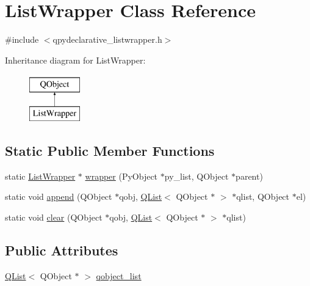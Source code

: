\hypertarget{classListWrapper}{}\section{List\+Wrapper Class Reference}
\label{classListWrapper}


{\ttfamily \#include $<$qpydeclarative\+\_\+listwrapper.\+h$>$}

Inheritance diagram for List\+Wrapper\+:\begin{figure}[H]
\begin{center}
\leavevmode
\includegraphics[height=2.000000cm]{classListWrapper}
\end{center}
\end{figure}
\subsection*{Static Public Member Functions}
\begin{DoxyCompactItemize}
\item 
static \hyperlink{classListWrapper}{List\+Wrapper} $\ast$ \hyperlink{classListWrapper_acf34beb48877307fb77b4ca80c613fe8}{wrapper} (Py\+Object $\ast$py\+\_\+list, Q\+Object $\ast$parent)
\item 
static void \hyperlink{classListWrapper_ad461390536ada307a954ac195e95a75a}{append} (Q\+Object $\ast$qobj, \hyperlink{classQList}{Q\+List}$<$ Q\+Object $\ast$ $>$ $\ast$qlist, Q\+Object $\ast$el)
\item 
static void \hyperlink{classListWrapper_abbd49fa9540eedd1797faf09906d2d2d}{clear} (Q\+Object $\ast$qobj, \hyperlink{classQList}{Q\+List}$<$ Q\+Object $\ast$ $>$ $\ast$qlist)
\end{DoxyCompactItemize}
\subsection*{Public Attributes}
\begin{DoxyCompactItemize}
\item 
\hyperlink{classQList}{Q\+List}$<$ Q\+Object $\ast$ $>$ \hyperlink{classListWrapper_a7420a79cacc271c9e65bd6fc1a5de39b}{qobject\+\_\+list}
\end{DoxyCompactItemize}


